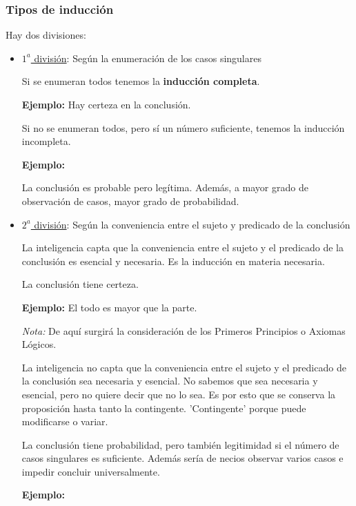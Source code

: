 \documentclass{article}
\begin{document}
\subsubsection{Tipos de inducción}
Hay dos divisiones:
\begin{itemize}
    \item \underline{$1^a$ división}: Según la enumeración de los casos singulares
    \par Si se enumeran todos tenemos la \textbf{inducción completa}.
    \par \textbf{Ejemplo:}
    Hay certeza en la conclusión.
    
    \par Si no se enumeran todos, pero sí un número suficiente, tenemos la inducción incompleta.
    \par \textbf{Ejemplo:}
    
    La conclusión es probable pero legítima. Además, a mayor grado de observación de casos, mayor grado de probabilidad.
    \\
    \item \underline{$2^a$ división}: Según la conveniencia entre el sujeto y predicado de la conclusión
    \par La inteligencia capta que la conveniencia entre el sujeto y el predicado de la conclusión es esencial y necesaria. Es la inducción en materia necesaria.
    \par La conclusión tiene certeza.
    \par \textbf{Ejemplo:} El todo es mayor que la parte.
    \par \textit{Nota:} De aquí surgirá la consideración de los Primeros Principios o Axiomas Lógicos.
    \par La inteligencia no capta que la conveniencia entre el sujeto y el predicado de la conclusión sea necesaria y esencial. No sabemos que sea necesaria y esencial, pero no quiere decir que no lo sea. Es por esto que se conserva la proposición hasta tanto la contingente. 'Contingente' porque puede modificarse o variar. \par
    La conclusión tiene probabilidad, pero también legitimidad si el número de casos singulares es suficiente. Además sería de necios observar varios casos e impedir concluir universalmente. \par
    \textbf{Ejemplo:}
    

\end{itemize}
\end{document}
